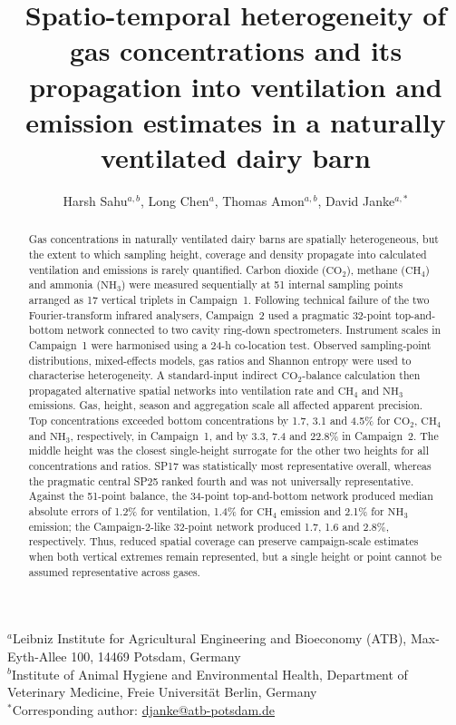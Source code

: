﻿\documentclass[12pt,a4paper]{article}
\title{Spatio-temporal heterogeneity of gas concentrations and its propagation into ventilation and emission estimates in a naturally ventilated dairy barn}
\author{Harsh Sahu$^{a,b}$, Long Chen$^{a}$, Thomas Amon$^{a,b}$, David Janke$^{a,*}$}
\date{}
\begin{document}
\maketitle
\begin{center}\small
$^{a}$Leibniz Institute for Agricultural Engineering and Bioeconomy (ATB), Max-Eyth-Allee 100, 14469 Potsdam, Germany\\
$^{b}$Institute of Animal Hygiene and Environmental Health, Department of Veterinary Medicine, Freie Universit\"at Berlin, Germany\\
$^{*}$Corresponding author: \href{mailto:djanke@atb-potsdam.de}{djanke@atb-potsdam.de}
\end{center}

\begin{abstract}
Gas concentrations in naturally ventilated dairy barns are spatially heterogeneous, but the extent to which sampling height, coverage and density propagate into calculated ventilation and emissions is rarely quantified. Carbon dioxide (\(\mathrm{CO_2}\)), methane (\(\mathrm{CH_4}\)) and ammonia (\(\mathrm{NH_3}\)) were measured sequentially at 51 internal sampling points arranged as 17 vertical triplets in Campaign~1. Following technical failure of the two Fourier-transform infrared analysers, Campaign~2 used a pragmatic 32-point top-and-bottom network connected to two cavity ring-down spectrometers. Instrument scales in Campaign~1 were harmonised using a 24-h co-location test. Observed sampling-point distributions, mixed-effects models, gas ratios and Shannon entropy were used to characterise heterogeneity. A standard-input indirect \(\mathrm{CO_2}\)-balance calculation then propagated alternative spatial networks into ventilation rate and \(\mathrm{CH_4}\) and \(\mathrm{NH_3}\) emissions. Gas, height, season and aggregation scale all affected apparent precision. Top concentrations exceeded bottom concentrations by 1.7, 3.1 and 4.5\% for \(\mathrm{CO_2}\), \(\mathrm{CH_4}\) and \(\mathrm{NH_3}\), respectively, in Campaign~1, and by 3.3, 7.4 and 22.8\% in Campaign~2. The middle height was the closest single-height surrogate for the other two heights for all concentrations and ratios. SP17 was statistically most representative overall, whereas the pragmatic central SP25 ranked fourth and was not universally representative. Against the 51-point balance, the 34-point top-and-bottom network produced median absolute errors of 1.2\% for ventilation, 1.4\% for \(\mathrm{CH_4}\) emission and 2.1\% for \(\mathrm{NH_3}\) emission; the Campaign-2-like 32-point network produced 1.7, 1.6 and 2.8\%, respectively. Thus, reduced spatial coverage can preserve campaign-scale estimates when both vertical extremes remain represented, but a single height or point cannot be assumed representative across gases.
\end{abstract}
\end{document}
